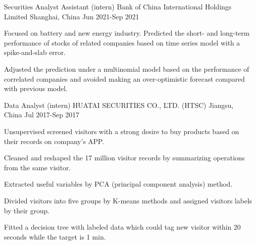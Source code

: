 \begin{cventries}
  \cventry
    {Securities Analyst Assistant (intern)} %
    {Bank of China International Holdings Limited} %
    {Shanghai, China} %
    {Jun 2021-Sep 2021} %
    {
      \begin{cvitems} %
        \item {Focused on battery and new energy industry. Predicted the short- and long-term performance of stocks of related companies based on time series model with a spike-and-slab error.}
        \item {Adjusted the prediction under a multinomial model based on the performance of correlated companies and avoided making an over-optimistic forecast compared with previous model.}
      \end{cvitems}
    }

  \cventry
    {Data Analyst (intern)} %
    {HUATAI SECURITIES CO., LTD. (HTSC)} %
    {Jiangsu, China} %
    {Jul 2017-Sep 2017} %
    {
      \begin{cvitems} %
        \item {Unsupervised screened visitors with a strong desire to buy products based on their records on company’s APP.}
        \item {Cleaned and reshaped the 17 million visitor records by summarizing operations from the same visitor.}
        \item {Extracted useful variables by PCA (principal component analysis) method.}
        \item {Divided visitors into five groups by K-means methods and assigned visitors labels by their group.}
        \item {Fitted a decision tree with labeled data which could tag new visitor within 20 seconds while the target is 1 min.}
      \end{cvitems}
    }



\end{cventries}
